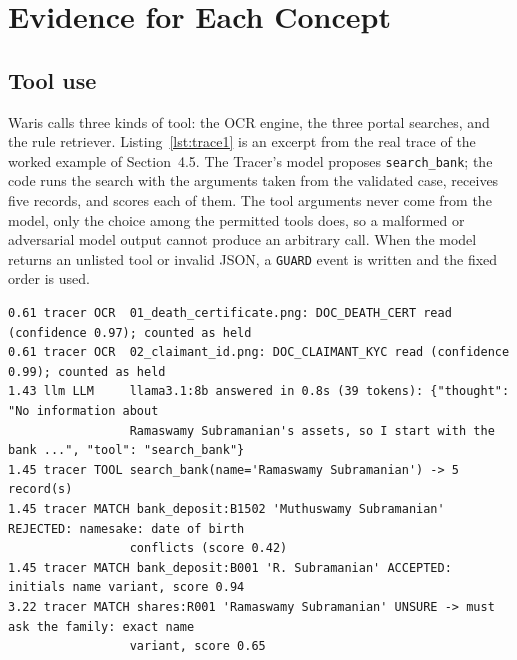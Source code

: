 \documentclass[12pt,a4paper,oneside]{report}
\begin{document}
\section{Evidence for Each Concept}

\subsection{Tool use}
Waris calls three kinds of tool: the OCR engine, the three portal searches, and the rule retriever. Listing~\ref{lst:trace1} is an excerpt from the real trace of the worked example of Section~4.5. The Tracer's model proposes \texttt{search\_bank}; the code runs the search with the arguments taken from the validated case, receives five records, and scores each of them. The tool arguments never come from the model, only the choice among the permitted tools does, so a malformed or adversarial model output cannot produce an arbitrary call. When the model returns an unlisted tool or invalid JSON, a \texttt{GUARD} event is written and the fixed order is used.

\begin{lstlisting}[caption={Excerpt of the trace of the worked example: OCR, a model-chosen tool call and identity scoring (timestamps in seconds; long lines shortened).},label={lst:trace1},numbers=none,basicstyle=\ttfamily\scriptsize\setstretch{1.0}]
0.61 tracer OCR  01_death_certificate.png: DOC_DEATH_CERT read (confidence 0.97); counted as held
0.61 tracer OCR  02_claimant_id.png: DOC_CLAIMANT_KYC read (confidence 0.99); counted as held
1.43 llm LLM     llama3.1:8b answered in 0.8s (39 tokens): {"thought": "No information about
                 Ramaswamy Subramanian's assets, so I start with the bank ...", "tool": "search_bank"}
1.45 tracer TOOL search_bank(name='Ramaswamy Subramanian') -> 5 record(s)
1.45 tracer MATCH bank_deposit:B1502 'Muthuswamy Subramanian' REJECTED: namesake: date of birth
                 conflicts (score 0.42)
1.45 tracer MATCH bank_deposit:B001 'R. Subramanian' ACCEPTED: initials name variant, score 0.94
3.22 tracer MATCH shares:R001 'Ramaswamy Subramanian' UNSURE -> must ask the family: exact name
                 variant, score 0.65
\end{lstlisting}
\end{document}
